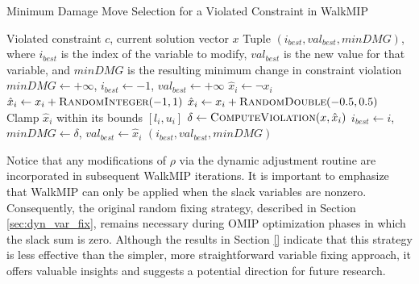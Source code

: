 \begin{algorithm}[H]
\caption{Minimum Damage Move Selection for a Violated Constraint in WalkMIP}
\begin{algorithmic}
\Require Violated constraint $c$, current solution vector $x$
\Ensure Tuple $(i_{best}, val_{best}, minDMG)$, where $i_{best}$ is the index of the variable to modify, $val_{best}$ is the new value for that variable, and $minDMG$ is the resulting minimum change in constraint violation
\label{alg:min_DMG_WalkMIP}
    \State $minDMG \gets +\infty$, $i_{best} \gets -1$, $val_{best} \gets +\infty$
         $\hat{x}_i \gets \neg x_i$
         $\hat{x}_i \gets x_i + \Call{RandomInteger}{-1,1}$
         $\hat{x}_i \gets x_i + \Call{RandomDouble}{-0.5,0.5}$
        \EndIf
        \State Clamp $\hat{x}_i$ within its bounds $[l_i,u_i]$
        \State $\delta \gets \Call{ComputeViolation}{x,\hat{x}_i}$
            \State $i_{best} \gets i$, $minDMG \gets \delta$, $val_{best} \gets \hat{x}_i$
        \EndIf
    \EndFor
    \State \Return $(i_{best}, val_{best}, minDMG)$
\EndFunction
\end{algorithmic}
\end{algorithm}

Notice that any modifications of $\rho$ via the dynamic adjustment routine are incorporated in subsequent WalkMIP iterations. It is important to emphasize that WalkMIP can only be applied when the slack variables are nonzero. Consequently, the original random fixing strategy, described in Section \ref{sec:dyn_var_fix}, remains necessary during OMIP optimization phases in which the slack sum is zero.
Although the results in Section \ref{} indicate that this strategy is less effective than the simpler, more straightforward variable fixing approach, it offers valuable insights and suggests a potential direction for future research.